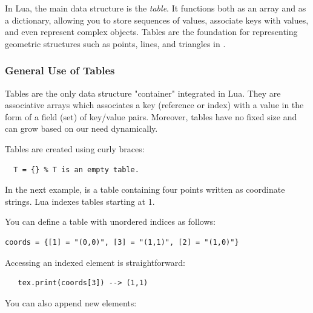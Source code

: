 In Lua, the main data structure is the \emph{table}. It functions both as an array and as a dictionary, allowing you to store sequences of values, associate keys with values, and even represent complex objects. Tables are the foundation for representing geometric structures such as points, lines, and triangles in .

\subsubsection{General Use of Tables}

Tables are the only data structure "container" integrated in Lua.
 They are associative arrays  which associates a key (reference or index) with a value in the form of a field (set) of key/value pairs. Moreover, tables have no fixed size and can grow based on our need dynamically.

Tables are created using curly braces:

\begin{mybox}
\begin{verbatim}
  T = {} % T is an empty table.
\end{verbatim}
\end{mybox}

In the next example,  is a table containing four points written as coordinate strings. Lua indexes tables starting at 1.

\begin{tkzexample}[latex=0.35\textwidth]
\end{tkzexample}

You can define a table with unordered indices as follows:

\begin{mybox}
\begin{verbatim}
coords = {[1] = "(0,0)", [3] = "(1,1)", [2] = "(1,0)"}
\end{verbatim}
\end{mybox}

Accessing an indexed element is straightforward:

\begin{verbatim}
   tex.print(coords[3]) --> (1,1)
\end{verbatim}

You can also append new elements:


